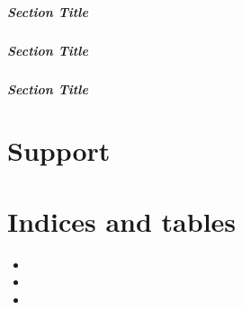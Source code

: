 \documentclass[letterpaper,10pt,english]{sphinxmanual}
\begin{document}
\paragraph{Section Title}
\label{\detokenize{install:id5}}

\paragraph{Section Title}
\label{\detokenize{install:id6}}

\paragraph{Section Title}
\label{\detokenize{install:id7}}
\sphinxstepscope


\chapter{Support}
\label{\detokenize{support:support}}\label{\detokenize{support::doc}}

\chapter{Indices and tables}
\label{\detokenize{index:indices-and-tables}}\begin{itemize}
\item {} 
\sphinxAtStartPar
{}

\item {} 
\sphinxAtStartPar
{}

\item {} 
\sphinxAtStartPar
{}

\end{itemize}



\renewcommand{\indexname}{Index}
\printindex
\end{document}
